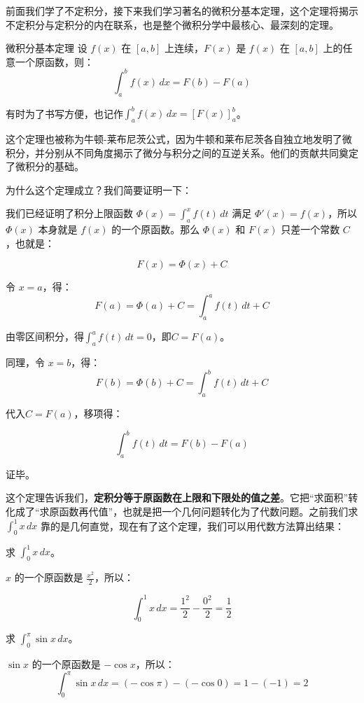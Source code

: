 前面我们学了不定积分，接下来我们学习著名的微积分基本定理，这个定理将揭示不定积分与定积分的内在联系，也是整个微积分学中最核心、最深刻的定理。

\begin{theorem}{微积分基本定理}{}
设 $f(x)$ 在 $[a, b]$ 上连续，$F(x)$ 是 $f(x)$ 在 $[a, b]$ 上的任意一个原函数，则：
\[
\int_a^b f(x)\, dx = F(b) - F(a)
\]
\end{theorem}

有时为了书写方便，也记作\(\int_a^b f(x)\, dx = [F(x)]_a^b\)。

这个定理也被称为牛顿-莱布尼茨公式，因为牛顿和莱布尼茨各自独立地发明了微积分，并分别从不同角度揭示了微分与积分之间的互逆关系。他们的贡献共同奠定了微积分的基础。

为什么这个定理成立？我们简要证明一下：

我们已经证明了积分上限函数 $\Phi(x) = \int_a^x f(t)\,dt$ 满足 $\Phi'(x) = f(x)$，所以 $\Phi(x)$ 本身就是 $f(x)$ 的一个原函数。那么 $\Phi(x)$ 和 $F(x)$ 只差一个常数 $C$，也就是：

\[F(x) = \Phi(x) + C\]

令 $x = a$，得： \[F(a)=\Phi(a) +C = \int_a^a f(t)\,dt + C \]

由零区间积分，得\(\int_a^a f(t)\,dt=0\)，即$C = F(a)$。

同理，令 $x = b$，得：
\[
F(b)=\Phi(b) +C = \int_a^b f(t)\,dt + C
\]

代入$C = F(a)$，移项得：

\[
\int_a^b f(t)\,dt=F(b)-F(a)
\]

证毕。

这个定理告诉我们，\textbf{定积分等于原函数在上限和下限处的值之差}。它把“求面积”转化成了“求原函数再代值”，也就是把一个几何问题转化为了代数问题。之前我们求 $\int_0^1 x\,dx$ 靠的是几何直觉，现在有了这个定理，我们可以用代数方法算出结果：

\begin{myexample}
  求 $\int_0^1 x\, dx$。

  $x$ 的一个原函数是 $\frac{x^2}{2}$，所以：
  
  \[
  \int_0^1 x\, dx= \frac{1^2}{2} - \frac{0^2}{2} = \frac{1}{2}
  \]
\end{myexample}

\begin{myexample}
  求 $\int_0^\pi \sin x\, dx$。

  $\sin x$ 的一个原函数是 $-\cos x$，所以：
  \[
  \int_0^\pi \sin x\, dx = (-\cos\pi) - (-\cos 0) = 1 - (-1) = 2
  \]
\end{myexample}

